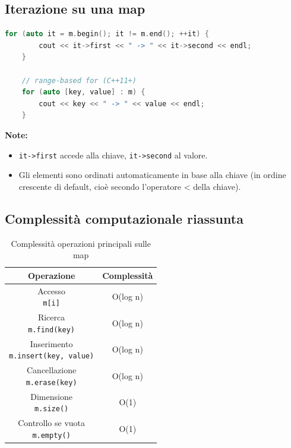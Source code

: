 \subsection{Iterazione su una map}

\begin{lstlisting}[language=C++]
	for (auto it = m.begin(); it != m.end(); ++it) {
		cout << it->first << " -> " << it->second << endl;
	}
	
	// range-based for (C++11+)
	for (auto [key, value] : m) {
		cout << key << " -> " << value << endl;
	}
\end{lstlisting}

\textbf{Note: }
\begin{itemize}
	\item \texttt{it->first} accede alla chiave, \texttt{it->second} al valore.
	\item Gli elementi sono ordinati automaticamente in base alla chiave (in ordine crescente di default, cioè secondo l’operatore < della chiave).
\end{itemize}






\subsection{Complessità computazionale riassunta}

\begin{table}[h!]
	\centering
	\renewcommand{\arraystretch}{1.5}
	\setlength{\tabcolsep}{12pt}
	\begin{tabular}{|c|c|}
		\hline
		\textbf{Operazione} & \textbf{Complessità} \\
		\hline
		\makecell{Accesso \\ \texttt{m[i]}} & O(log n) \\
		\hline
		\makecell{Ricerca \\ \texttt{m.find(key)}} & O(log n) \\
		\hline
		\makecell{Inserimento \\ \texttt{m.insert({key, value})}} & O(log n) \\
		\hline
		\makecell{Cancellazione \\ \texttt{m.erase(key)}} & O(log n) \\
		\hline
		\makecell{Dimensione \\ \texttt{m.size()}} & O(1) \\
		\hline
		\makecell{Controllo se vuota \\ \texttt{m.empty()}} & O(1) \\
		\hline
	\end{tabular}
	\caption{Complessità operazioni principali sulle map}
\end{table}




